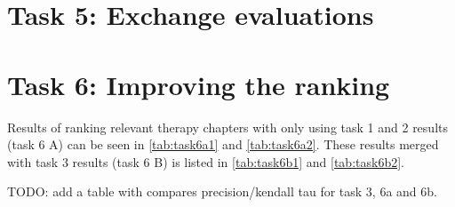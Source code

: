\section{Task 5: Exchange evaluations}


\section{Task 6: Improving the ranking}
Results of ranking relevant therapy chapters with only using task 1 and 2
results (task 6 A) can be seen in \autoref{tab:task6a1} and
\autoref{tab:task6a2}. These results merged with task 3 results (task 6 B)
is listed in \autoref{tab:task6b1} and \autoref{tab:task6b2}.

TODO: add a table with compares precision/kendall tau for task 3, 6a and 6b.

